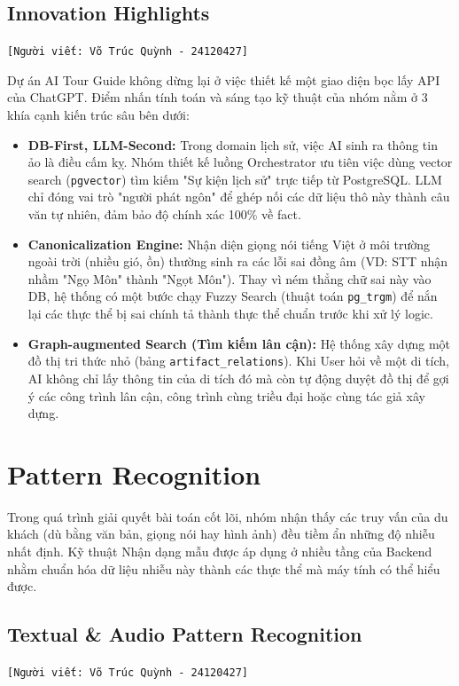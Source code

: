 \subsection{Innovation Highlights}
\texttt{[Người viết: Võ Trúc Quỳnh - 24120427]}

Dự án AI Tour Guide không dừng lại ở việc thiết kế một giao diện bọc lấy API của ChatGPT. Điểm nhấn tính toán và sáng tạo kỹ thuật của nhóm nằm ở 3 khía cạnh kiến trúc sâu bên dưới:

\begin{itemize}
    \item \textbf{DB-First, LLM-Second:} Trong domain lịch sử, việc AI sinh ra thông tin ảo là điều cấm kỵ. Nhóm thiết kế luồng Orchestrator ưu tiên việc dùng vector search (\texttt{pgvector}) tìm kiếm "Sự kiện lịch sử" trực tiếp từ PostgreSQL. LLM chỉ đóng vai trò "người phát ngôn" để ghép nối các dữ liệu thô này thành câu văn tự nhiên, đảm bảo độ chính xác 100\% về fact.
    \item \textbf{Canonicalization Engine:} Nhận diện giọng nói tiếng Việt ở môi trường ngoài trời (nhiều gió, ồn) thường sinh ra các lỗi sai đồng âm (VD: STT nhận nhầm "Ngọ Môn" thành "Ngọt Môn"). Thay vì ném thẳng chữ sai này vào DB, hệ thống có một bước chạy Fuzzy Search (thuật toán \texttt{pg\_trgm}) để nắn lại các thực thể bị sai chính tả thành thực thể chuẩn trước khi xử lý logic.
    \item \textbf{Graph-augmented Search (Tìm kiếm lân cận):} Hệ thống xây dựng một đồ thị tri thức nhỏ (bảng \texttt{artifact\_relations}). Khi User hỏi về một di tích, AI không chỉ lấy thông tin của di tích đó mà còn tự động duyệt đồ thị để gợi ý các công trình lân cận, công trình cùng triều đại hoặc cùng tác giả xây dựng.
\end{itemize}


\section{Pattern Recognition}

Trong quá trình giải quyết bài toán cốt lõi, nhóm nhận thấy các truy vấn của du khách (dù bằng văn bản, giọng nói hay hình ảnh) đều tiềm ẩn những độ nhiễu nhất định. Kỹ thuật Nhận dạng mẫu được áp dụng ở nhiều tầng của Backend nhằm chuẩn hóa dữ liệu nhiễu này thành các thực thể mà máy tính có thể hiểu được.

\subsection{Textual \& Audio Pattern Recognition}
\texttt{[Người viết: Võ Trúc Quỳnh - 24120427]}

